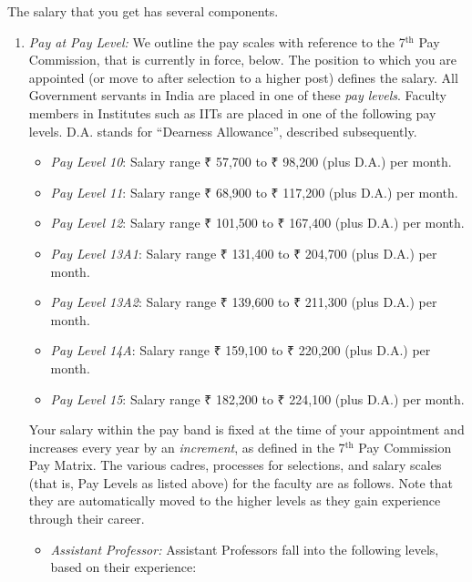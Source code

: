 \documentclass[
  10pt,
  a5paper,
  10pt,
  openany]{amsbook}
\providecommand{\tightlist}{%
  \setlength{\itemsep}{0pt}\setlength{\parskip}{0pt}}
\begin{document}
The salary that you get has several components.

\begin{enumerate}
\def\labelenumi{\arabic{enumi}.}
\item
  \emph{Pay at Pay Level:} We outline the pay scales with reference to
  the 7\(^{\text{th}}\) Pay Commission, that is currently in force,
  below. The position to which you are appointed (or move to after
  selection to a higher post) defines the salary. All Government
  servants in India are placed in one of these \emph{pay levels}.
  Faculty members in Institutes such as IITs are placed in one of the
  following pay levels. D.A. stands for ``Dearness Allowance'',
  described subsequently.

  \begin{itemize}
  \tightlist
  \item
    \emph{Pay Level 10}: Salary range ₹ 57,700 to ₹ 98,200 (plus D.A.)
    per month.
  \item
    \emph{Pay Level 11}: Salary range ₹ 68,900 to ₹ 117,200 (plus D.A.)
    per month.
  \item
    \emph{Pay Level 12}: Salary range ₹ 101,500 to ₹ 167,400 (plus D.A.)
    per month.
  \item
    \emph{Pay Level 13A1}: Salary range ₹ 131,400 to ₹ 204,700 (plus
    D.A.) per month.
  \item
    \emph{Pay Level 13A2}: Salary range ₹ 139,600 to ₹ 211,300 (plus
    D.A.) per month.
  \item
    \emph{Pay Level 14A}: Salary range ₹ 159,100 to ₹ 220,200 (plus
    D.A.) per month.
  \item
    \emph{Pay Level 15}: Salary range ₹ 182,200 to ₹ 224,100 (plus D.A.)
    per month.
  \end{itemize}

  Your salary within the pay band is fixed at the time of your
  appointment and increases every year by an \emph{increment}, as
  defined in the 7\(^{\text{th}}\) Pay Commission Pay Matrix. The
  various cadres, processes for selections, and salary scales (that is,
  Pay Levels as listed above) for the faculty are as follows. Note that
  they are automatically moved to the higher levels as they gain
  experience through their career.

  \begin{itemize}
  \item
    \emph{Assistant Professor:} Assistant Professors fall into the
    following levels, based on their experience:


\end{itemize}
\end{enumerate}
\end{document}
